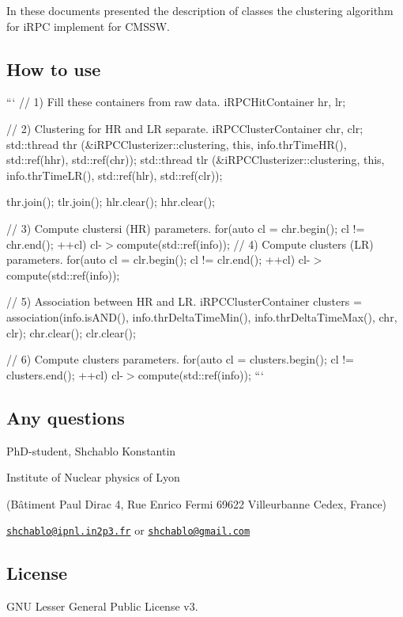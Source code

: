 In these documents presented the description of classes the clustering algorithm for i\-R\-P\-C implement for C\-M\-S\-S\-W.

\subsection*{How to use}

``` // 1) Fill these containers from raw data. i\-R\-P\-C\-Hit\-Container hr, lr;

// 2) Clustering for H\-R and L\-R separate. i\-R\-P\-C\-Cluster\-Container chr, clr; std\-::thread thr (\&i\-R\-P\-C\-Clusterizer\-::clustering, this, info.\-thr\-Time\-H\-R(), std\-::ref(hhr), std\-::ref(chr)); std\-::thread tlr (\&i\-R\-P\-C\-Clusterizer\-::clustering, this, info.\-thr\-Time\-L\-R(), std\-::ref(hlr), std\-::ref(clr));

thr.\-join(); tlr.\-join(); hlr.\-clear(); hhr.\-clear();

// 3) Compute clustersi (H\-R) parameters. for(auto cl = chr.\-begin(); cl != chr.\-end(); ++cl) cl-\/$>$compute(std\-::ref(info)); // 4) Compute clusters (L\-R) parameters. for(auto cl = clr.\-begin(); cl != clr.\-end(); ++cl) cl-\/$>$compute(std\-::ref(info));

// 5) Association between H\-R and L\-R. i\-R\-P\-C\-Cluster\-Container clusters = association(info.\-is\-A\-N\-D(), info.\-thr\-Delta\-Time\-Min(), info.\-thr\-Delta\-Time\-Max(), chr, clr); chr.\-clear(); clr.\-clear();

// 6) Compute clusters parameters. for(auto cl = clusters.\-begin(); cl != clusters.\-end(); ++cl) cl-\/$>$compute(std\-::ref(info)); ``` \subsection*{Any questions}

Ph\-D-\/student, Shchablo Konstantin \par
 Institute of Nuclear physics of Lyon \par
 (Bâtiment Paul Dirac 4, Rue Enrico Fermi 69622 Villeurbanne Cedex, France) \par
 \href{mailto:shchablo@ipnl.in2p3.fr}{\tt shchablo@ipnl.\-in2p3.\-fr} or \href{mailto:shchablo@gmail.com}{\tt shchablo@gmail.\-com}

\subsection*{License}

G\-N\-U Lesser General Public License v3. 